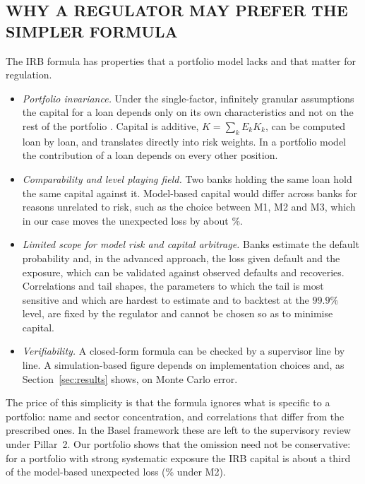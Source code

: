 \subsection{WHY A REGULATOR MAY PREFER THE SIMPLER FORMULA}
\label{subsec:irbpref}
The IRB formula has properties that a portfolio model lacks and that matter for regulation.
\begin{itemize}
\item \emph{Portfolio invariance.} Under the single-factor, infinitely granular assumptions the capital for a loan depends only on its own characteristics and not on the rest of the portfolio \citep{Gordy03}. Capital is additive, $K=\sum_kE_kK_k$, can be computed loan by loan, and translates directly into risk weights. In a portfolio model the contribution of a loan depends on every other position.
\item \emph{Comparability and level playing field.} Two banks holding the same loan hold the same capital against it. Model-based capital would differ across banks for reasons unrelated to risk, such as the choice between M1, M2 and M3, which in our case moves the unexpected loss by about \%.
\item \emph{Limited scope for model risk and capital arbitrage.} Banks estimate the default probability and, in the advanced approach, the loss given default and the exposure, which can be validated against observed defaults and recoveries. Correlations and tail shapes, the parameters to which the tail is most sensitive and which are hardest to estimate and to backtest at the $99.9\%$ level, are fixed by the regulator and cannot be chosen so as to minimise capital.
\item \emph{Verifiability.} A closed-form formula can be checked by a supervisor line by line. A simulation-based figure depends on implementation choices and, as Section~\ref{sec:results} shows, on Monte Carlo error.
\end{itemize}
The price of this simplicity is that the formula ignores what is specific to a portfolio: name and sector concentration, and correlations that differ from the prescribed ones. In the Basel framework these are left to the supervisory review under Pillar~2. Our portfolio shows that the omission need not be conservative: for a portfolio with strong systematic exposure the IRB capital is about a third of the model-based unexpected loss (\% under M2).
